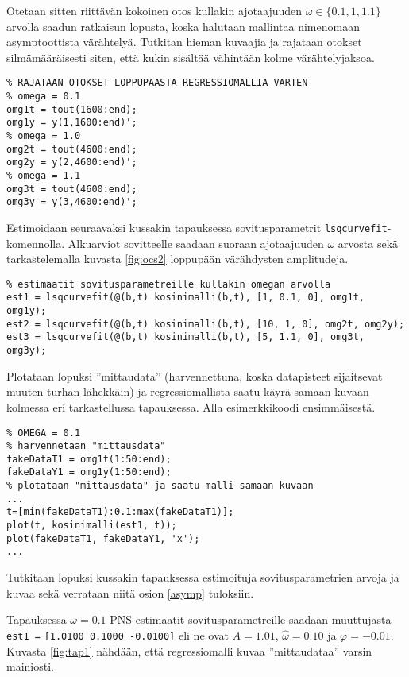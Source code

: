 \documentclass[a4paper,11pt]{article}
\begin{document}
Otetaan sitten riittävän kokoinen otos kullakin ajotaajuuden $\omega \in \{0.1,1,1.1\}$ arvolla saadun ratkaisun lopusta, koska halutaan mallintaa nimenomaan asymptoottista värähtelyä. Tutkitan hieman kuvaajia ja rajataan otokset silmämääräisesti siten, että kukin sisältää vähintään kolme värähtelyjaksoa.

\begin{lstlisting}
% RAJATAAN OTOKSET LOPPUPAASTA REGRESSIOMALLIA VARTEN
% omega = 0.1
omg1t = tout(1600:end);
omg1y = y(1,1600:end)';
% omega = 1.0
omg2t = tout(4600:end);
omg2y = y(2,4600:end)';
% omega = 1.1
omg3t = tout(4600:end);
omg3y = y(3,4600:end)';
\end{lstlisting}

Estimoidaan seuraavaksi kussakin tapauksessa sovitusparametrit \texttt{lsqcurvefit}-komennolla. Alkuarviot sovitteelle saadaan suoraan ajotaajuuden $\omega$ arvosta sekä tarkastelemalla kuvasta \ref{fig:ocs2} loppupään värähdysten amplitudeja.

\begin{lstlisting}
% estimaatit sovitusparametreille kullakin omegan arvolla
est1 = lsqcurvefit(@(b,t) kosinimalli(b,t), [1, 0.1, 0], omg1t, omg1y);
est2 = lsqcurvefit(@(b,t) kosinimalli(b,t), [10, 1, 0], omg2t, omg2y);
est3 = lsqcurvefit(@(b,t) kosinimalli(b,t), [5, 1.1, 0], omg3t, omg3y);
\end{lstlisting}

Plotataan lopuksi ''mittaudata'' (harvennettuna, koska datapisteet sijaitsevat muuten turhan lähekkäin) ja regressiomallista saatu käyrä samaan kuvaan kolmessa eri tarkastellussa tapauksessa. Alla esimerkkikoodi ensimmäisestä.

\begin{lstlisting}
% OMEGA = 0.1
% harvennetaan "mittausdata"
fakeDataT1 = omg1t(1:50:end);
fakeDataY1 = omg1y(1:50:end);
% plotataan "mittausdata" ja saatu malli samaan kuvaan
...
t=[min(fakeDataT1):0.1:max(fakeDataT1)];
plot(t, kosinimalli(est1, t));
plot(fakeDataT1, fakeDataY1, 'x');
...
\end{lstlisting}

Tutkitaan lopuksi kussakin tapauksessa estimoituja sovitusparametrien arvoja ja kuvaa sekä verrataan niitä osion \ref{asymp} tuloksiin.

Tapauksessa $\omega = 0.1$ PNS-estimaatit sovitusparametreille saadaan muuttujasta \texttt{est1 =} \texttt{[1.0100 0.1000 -0.0100]} eli ne ovat $A=1.01$, $\hat{\omega}=0.10$ ja $\varphi=-0.01$. Kuvasta \ref{fig:tap1} nähdään, että regressiomalli kuvaa ''mittaudataa'' varsin mainiosti. 
\end{document}
